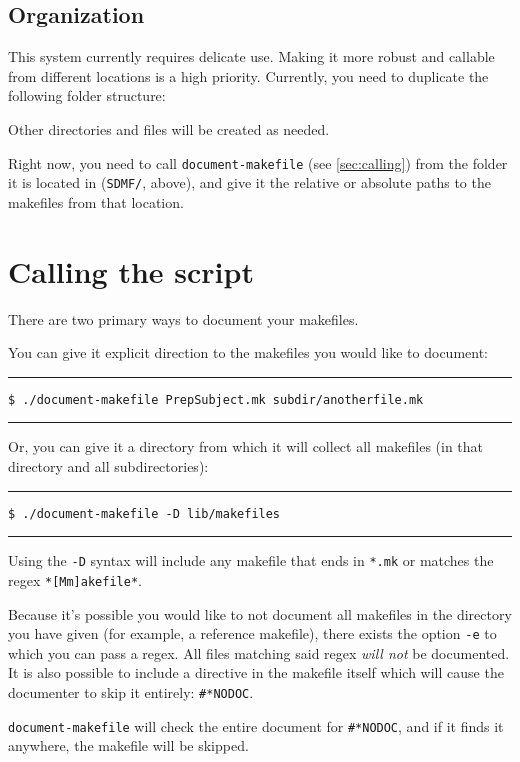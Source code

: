 \documentclass[oneside,11pt]{article}
\newcommand{\bashcmd}[1]{ \hfill\, \begin{minipage}[t]{\linewidth}  \hrule \vspace{0.5\baselineskip} \texttt{\small \$ #1} \vspace{0.5\baselineskip} \hrule \end{minipage} \vspace{0.5\baselineskip} }
\begin{document}
	\subsection{Organization}
	
	This system currently requires delicate use. Making it more robust and callable from different locations is a high priority. Currently, you need to duplicate the following folder structure: \\
	
	\begin{tcolorbox}[title=Directory structure]	
	\end{tcolorbox}

	Other directories and files will be created as needed.
	
	Right now, you need to call \texttt{document-makefile} (see \autoref{sec:calling}) from the folder it is located in (\texttt{SDMF/}, above), and give it the relative or absolute paths to the makefiles from that location. 
	
	\section{Calling the script}
	\label{sec:calling}
	
	There are two primary ways to document your makefiles.
	
	You can give it explicit direction to the makefiles you would like to document:	
	\bashcmd{./document-makefile PrepSubject.mk subdir/anotherfile.mk}
	
	Or, you can give it a directory from which it will collect all makefiles (in that directory and all subdirectories):	
	\bashcmd{./document-makefile -D lib/makefiles}
	
	Using the \texttt{-D} syntax will include any makefile that ends in \texttt{*.mk} or matches the regex \texttt{*[Mm]akefile*}.
	
	Because it's possible you would like to not document all makefiles in the directory you have given (for example, a reference makefile), there exists the option \texttt{-e} to which you can pass a regex. All files matching said regex \textit{will not} be documented. It is also possible to include a directive in the makefile itself which will cause the documenter to skip it entirely: \texttt{\#*NODOC}.
	
	\texttt{document-makefile} will check the entire document for \texttt{\#*NODOC}, and if it finds it anywhere, the makefile will be skipped.
	
\end{document}
